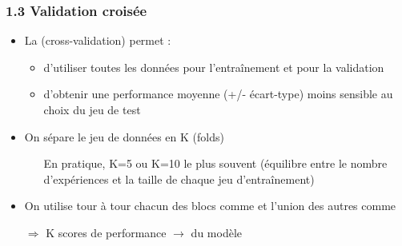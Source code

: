 \begin{frame}
  \frametitle{1.3 Validation croisée}
  \begin{itemize}
  \item La  \textcolor{gray!70}{(cross-validation)} permet :
    \begin{itemize}
    \item d'utiliser toutes les données pour l'entraînement et pour la validation
    \item d'obtenir une performance moyenne (+/- écart-type)  moins sensible au choix du jeu de test
    \end{itemize}
  \item On sépare le jeu de données en K  \textcolor{gray!70}{(folds)}
    \begin{itemize}
    \item[] En pratique, K=5 ou K=10 le plus souvent (équilibre entre le nombre
      d'expériences et la taille de chaque jeu d'entraînement)
    \end{itemize}
  \item On utilise tour à tour chacun des blocs comme  et l'union des autres comme 
  \item[$\Rightarrow$] K scores de performance $\rightarrow$  du modèle
  \end{itemize}
\end{frame}


